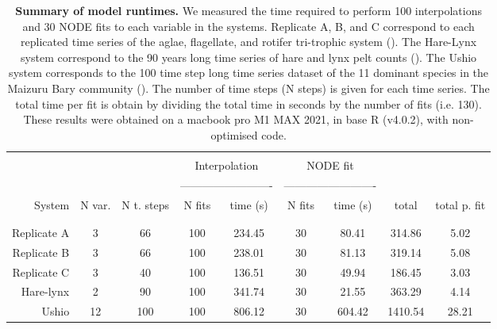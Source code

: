 \documentclass[11pt, oneside]{article}
\begin{document}
\newpage
\begin{table}[H]
\begin{center}
\caption{
\textbf{Summary of model runtimes.}
We measured the time required to perform 100 interpolations and 30 NODE fits to each variable in the systems.
Replicate A, B, and C correspond to each replicated time series of the aglae, flagellate, and rotifer tri-trophic system (\cite{Hiltunen2013}).
The Hare-Lynx system correspond to the 90 years long time series of hare and lynx pelt counts (\cite{Odum1972}).
    The Ushio system corresponds to the 100 time step long time series dataset of the 11 dominant species in the Maizuru Bary community (\cite{Ushio2018}).
The number of time steps (N steps) is given for each time series. 
The total time per fit is obtain by dividing the total time in seconds by the number of fits (i.e. 130).
These results were obtained on a macbook pro M1 MAX 2021, in base R (v4.0.2), with non-optimised code.
}
\begin{tabular}{rcccccccc}
\hline
& \\
& & & \multicolumn{2}{c}{Interpolation} & \multicolumn{2}{c}{NODE fit} & &  \\
& & & \multicolumn{2}{c}{-------------------------} & \multicolumn{2}{c}{-------------------------} & &  \\
System & N var. & N t. steps & N fits & time (s) & N fits & time (s) & total & total p. fit \\
& \\
\hline
& \\
Replicate A & 3  &  66 &  100 & 234.45 & 30 &  80.41 &  314.86 &  5.02 \\
Replicate B & 3  &  66 &  100 & 238.01 & 30 &  81.13 &  319.14 &  5.08 \\
Replicate C & 3  &  40 &  100 & 136.51 & 30 &  49.94 &  186.45 &  3.03 \\
Hare-lynx   & 2  &  90 &  100 & 341.74 & 30 &  21.55 &  363.29 &  4.14 \\
Ushio       & 12 & 100 &  100 & 806.12 & 30 & 604.42 & 1410.54 & 28.21 \\
\end{tabular}
\end{center}
\end{table}
\newpage
\end{document}
